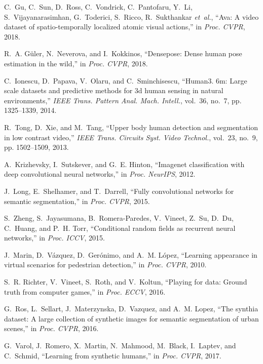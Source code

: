 \documentclass[final]{IEEEtran}
\begin{document}
{\begin{minipage}{\textwidth}
\begin{thebibliography}{1}
C.~Gu, C.~Sun, D.~Ross, C.~Vondrick, C.~Pantofaru, Y.~Li, S.~Vijayanarasimhan,
  G.~Toderici, S.~Ricco, R.~Sukthankar \emph{et~al.}, ``Ava: A video dataset of
  spatio-temporally localized atomic visual actions,'' in \emph{Proc. CVPR},
  2018.

R.~A. G{\"u}ler, N.~Neverova, and I.~Kokkinos, ``Densepose: Dense human pose
  estimation in the wild,'' in \emph{Proc. CVPR}, 2018.

C.~Ionescu, D.~Papava, V.~Olaru, and C.~Sminchisescu, ``Human3. 6m: Large scale
  datasets and predictive methods for 3d human sensing in natural
  environments,'' \emph{IEEE Trans. Pattern Anal. Mach. Intell.}, vol.~36,
  no.~7, pp. 1325--1339, 2014.

R.~Tong, D.~Xie, and M.~Tang, ``Upper body human detection and segmentation in
  low contrast video,'' \emph{IEEE Trans. Circuits Syst. Video Technol.},
  vol.~23, no.~9, pp. 1502--1509, 2013.

A.~Krizhevsky, I.~Sutskever, and G.~E. Hinton, ``Imagenet classification with
  deep convolutional neural networks,'' in \emph{Proc. NeurIPS}, 2012.

J.~Long, E.~Shelhamer, and T.~Darrell, ``Fully convolutional networks for
  semantic segmentation,'' in \emph{Proc. CVPR}, 2015.

S.~Zheng, S.~Jayasumana, B.~Romera-Paredes, V.~Vineet, Z.~Su, D.~Du, C.~Huang,
  and P.~H. Torr, ``Conditional random fields as recurrent neural networks,''
  in \emph{Proc. ICCV}, 2015.

J.~Marin, D.~V{\'a}zquez, D.~Ger{\'o}nimo, and A.~M. L{\'o}pez, ``Learning
  appearance in virtual scenarios for pedestrian detection,'' in \emph{Proc.
  CVPR}, 2010.

S.~R. Richter, V.~Vineet, S.~Roth, and V.~Koltun, ``Playing for data: Ground
  truth from computer games,'' in \emph{Proc. ECCV}, 2016.

G.~Ros, L.~Sellart, J.~Materzynska, D.~Vazquez, and A.~M. Lopez, ``The synthia
  dataset: A large collection of synthetic images for semantic segmentation of
  urban scenes,'' in \emph{Proc. CVPR}, 2016.

G.~Varol, J.~Romero, X.~Martin, N.~Mahmood, M.~Black, I.~Laptev, and C.~Schmid,
  ``Learning from synthetic humans,'' in \emph{Proc. CVPR}, 2017.


\end{thebibliography}
\end{minipage}}
\end{document}
